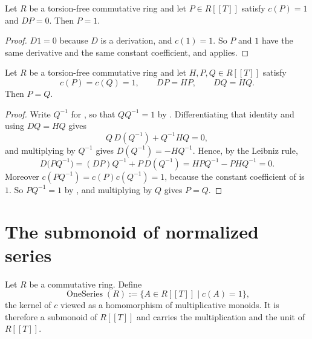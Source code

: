 \begin{lemma}
  \label{lemma:weil-eq-one-of-derivative-eq-zero}
  \leanok

  Let $R$ be a torsion-free commutative ring and let $P\in R[[T]]$ satisfy
  $c(P)=1$ and $DP=0$.  Then $P=1$.
\end{lemma}

\begin{proof}
  \leanok
  $D1=0$ because $D$ is a derivation, and $c(1)=1$.  So $P$ and $1$ have the
  same derivative and the same constant coefficient, and
  \texttt{} applies.
\end{proof}

\begin{lemma}
  \label{lemma:weil-eq-of-derivative-eq-mul}
  \leanok

  Let $R$ be a torsion-free commutative ring and let $H,P,Q\in R[[T]]$
  satisfy
  \[
    c(P)=c(Q)=1,\qquad DP=HP,\qquad DQ=HQ .
  \]
  Then $P=Q$.
\end{lemma}

\begin{proof}
  \leanok
  Write $Q^{-1}$ for \texttt{}, so that $QQ^{-1}=1$
  by \texttt{}.  Differentiating that
  identity and using $DQ=HQ$ gives
  \[
    Q\,D(Q^{-1})+Q^{-1}HQ=0 ,
  \]
  and multiplying by $Q^{-1}$ gives $D(Q^{-1})=-HQ^{-1}$.  Hence, by the
  Leibniz rule,
  \[
    D\bigl(PQ^{-1}\bigr)
      = (DP)Q^{-1}+P\,D(Q^{-1})
      = HPQ^{-1}-PHQ^{-1}=0 .
  \]
  Moreover $c(PQ^{-1})=c(P)c(Q^{-1})=1$, because the constant coefficient of
  \texttt{} is $1$.  So $PQ^{-1}=1$ by
  , and multiplying by $Q$
  gives $P=Q$.
\end{proof}

\section{The submonoid of normalized series}
\label{sec:weil-one-series}

\begin{definition}
  \label{def:weil-one-submonoid}
  \leanok

  Let $R$ be a commutative ring.  Define
  \[
    \operatorname{OneSeries}(R):=\{A\in R[[T]]\mid c(A)=1\},
  \]
  the kernel of $c$ viewed as a homomorphism of multiplicative monoids.  It
  is therefore a submonoid of $R[[T]]$ and carries the multiplication and the
  unit of $R[[T]]$.

\end{definition}

